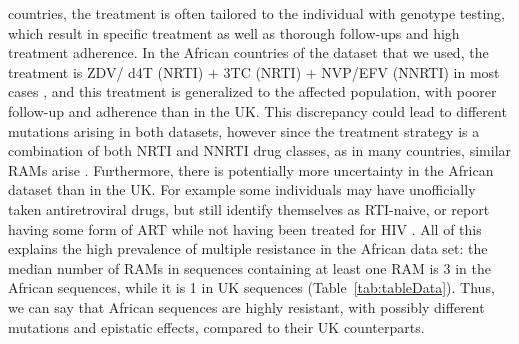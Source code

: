 \documentclass[
  11pt,
  twoside]{scrbook}
\begin{document}
countries, the treatment is often tailored to the individual with
genotype testing, which result in specific treatment as well as thorough
follow-ups and high treatment adherence. In the African countries of the
dataset that we used, the treatment is ZDV/ d4T (NRTI) + 3TC (NRTI) +
NVP/EFV (NNRTI) in most cases
\autocite{villabona-arenasIndepthAnalysisHIV12016}, and this treatment is
generalized to the affected population, with poorer follow-up and
adherence than in the UK. This discrepancy could lead to different
mutations arising in both datasets, however since the treatment strategy
is a combination of both NRTI and NNRTI drug classes, as in many
countries, similar RAMs arise
\autocite{villabona-arenasIndepthAnalysisHIV12016}. Furthermore, there is
potentially more uncertainty in the African dataset than in the UK. For
example some individuals may have unofficially taken antiretroviral
drugs, but still identify themselves as RTI-naive, or report having some
form of ART while not having been treated for HIV
\autocite{mooneySocialDesirabilityBias2018}. All of this explains the high
prevalence of multiple resistance in the African data set: the median
number of RAMs in sequences containing at least one RAM is 3 in the
African sequences, while it is 1 in UK sequences
(Table~\ref{tab:tableData}).
Thus, we can say that African sequences are highly resistant, with
possibly different mutations and epistatic effects, compared to their UK
counterparts.\\
\end{document}
